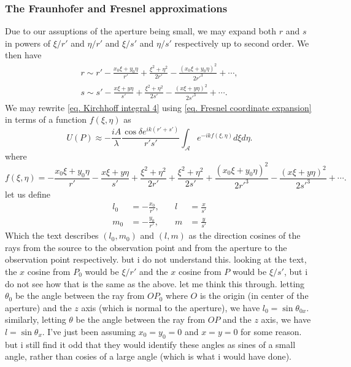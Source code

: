 \documentclass[../../main.tex]{subfiles} %
\begin{document}
\subsubsection{The Fraunhofer and Fresnel approximations}
Due to our assuptions of the aperture being small, we may expand both $r$ and $s$ in powers of $\xi/r'$ and $\eta/r'$ and $\xi/s'$ and $\eta/s'$ respectively up to second order. We then have 
\begin{equation} \label{eq. Fresnel coordinate expansion}
    \begin{aligned}
    r\sim r'-\frac{x_0\xi+y_0\eta}{r'}+\frac{\xi^2+\eta^2}{2r'}-\frac{(x_0\xi+y_0\eta)^2}{2r'^3}+\cdots,\\
    s\sim s'-\frac{x\xi+y\eta}{s'}+\frac{\xi^2+\eta^2}{2s'}-\frac{(x\xi+y\eta)^2}{2s'^3}+\cdots.
    \end{aligned}
\end{equation}
We may rewrite \ref{eq. Kirchhoff integral 4} using \ref{eq. Fresnel coordinate expansion} in terms of a function $f(\xi,\eta)$ as
\begin{equation} \label{eq. Kirchoff integral 5}
    U(P)\approx-\frac{iA}{\lambda}\frac{\cos\delta e^{ik(r'+s')}}{r's'}\int_{\mathcal{A}}e^{-ikf(\xi,\eta)}d\xi d\eta.
\end{equation}
where
\begin{equation} \label{eq. Fresnel f}
    f(\xi,\eta)=-\frac{x_0\xi+y_0\eta}{r'}-\frac{x\xi+y\eta}{s'}+\frac{\xi^2+\eta^2}{2r'}+\frac{\xi^2+\eta^2}{2s'}+\frac{(x_0\xi+y_0\eta)^2}{2r'^3}-\frac{(x\xi+y\eta)^2}{2s'^3}+\cdots.
\end{equation}
let us define
\begin{equation}
    \begin{aligned}
        l_0 &=-\frac{x_0}{r'},&\quad l&=\frac{x}{s'}\\
          m_0&=-\frac{y_0}{r'},& \quad m&=\frac{y}{s'}
    \end{aligned}
\end{equation}
Which the text describes $(l_0,m_0)$ and $(l,m)$ as the direction cosines of the rays from the source to the observation point and from the aperture to the observation point respectively. but i do not understand this. looking at the text, the $x$ cosine from $P_0$ would be $\xi/r'$ and the $x$ cosine from $P$ would be $\xi/s'$, but i do not see how that is the same as the above. let me think this through. letting $\theta_0$ be the angle between the ray from $OP_0$ where $O$ is the origin (in center of the aperture) and the $z$ axis (which is normal to the aperture), we have $l_0=\sin\theta_{0x}$. similarly, letting $\theta$ be the angle between the ray from $OP$ and the $z$ axis, we have $l=\sin\theta_x$. I've just been assuming $x_0=y_0=0$ and $x=y=0$ for some reason. but i still find it odd that they would identify these angles as sines of a small angle, rather than cosies of a large angle (which is what i would have done).
\end{document}
